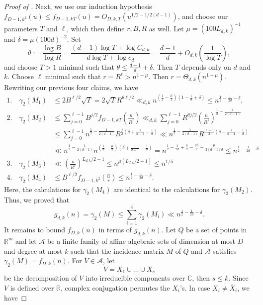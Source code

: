 \documentclass[10pt,a4paper]{amsart}
\begin{document}
\begin{proof}[Proof of ]
		Next, we use our induction hypothesis $f_{D-1,k^2}(u)\leq f_{D-1,kT}(u)= O_{D,k,T}(u^{1/2-1/2(d-1)})$, and choose our parameters $T$ and $\ell$, which then define $r,B,R$ as well. Let $\mu=(100L_{d,k})^{-1}$ and $\delta=\mu(100d)^{-2}$. Set
		$$\theta:=\frac{\log B}{\log R}=\frac{(d-1)\log T+\log C_{d,k}}{d\log T+\log c_{d}}=\frac{d-1}{d}+O_{d,k}\left(\frac{1}{\log T}\right),$$
		and choose $T>1$ minimal such that $\theta\leq \frac{d-1}{d}+\delta$. Then $T$ depends only on $d$ and $k$. Choose $\ell$ minimal such that $r=R^{\ell}>n^{1-\mu}$. Then $r=\Theta_{d,k}(n^{1-\mu})$. Rewriting our previous four claims, we have 
		\begin{align*}
			1.\quad \gamma_2(M_1)&\leq 2 B^{\ell/2}\sqrt{T}=2\sqrt{T} R^{\theta \ell/2}\ll_{d,k} n^{(\frac{1}{2}-\frac{\mu}{2})(1-\frac{1}{d}+\delta)}\leq n^{\frac{1}{2}-\frac{1}{2d}-\delta},\\
			2.\quad\gamma_2(M_2)&\leq \sum_{j=0}^{\ell-1}B^{j/2}f_{D-1,kT}\left(\frac{n}{R^j}\right)\ll_{d,k} \sum_{j=0}^{\ell-1} R^{\theta j/2} \left(\frac{n}{R^j}\right)^{\frac{1}{2}-\frac{1}{2(d-1)}}\\
			&\leq \sum_{j=0}^{\ell-1} n^{\frac{1}{2}-\frac{1}{2(d-1)}} R^{\frac{j}{2}(\delta+\frac{1}{d-1}-\frac{1}{d})}\ll n^{\frac{1}{2}-\frac{1}{2(d-1)}} R^{\frac{\ell-1}{2}(\delta+\frac{1}{d-1}-\frac{1}{d})}\\
			&\ll n^{\frac{1}{2}-\frac{1}{2(d-1)}} n^{(\frac{1}{2}-\frac{\mu}{2})(\delta+\frac{1}{d-1}-\frac{1}{d})}=n^{\frac{1}{2}-\frac{1}{2d}+\frac{\delta}{2}-\frac{\mu\delta}{2}-\frac{\mu}{2(d-1)d}}\leq n^{\frac{1}{2}-\frac{1}{2d}-\delta}\\
			3.\quad\gamma_2(M_3)&\ll \left(\frac{n}{R^{\ell}}\right)^{L_{d,k}/2-1}\leq n^{\mu (L_{d,k}/2-1)}\leq n^{1/5}\\
			4.\quad\gamma_2(M_4)&\leq B^{\ell/2}f_{D-1,k^2}\left(\frac{n}{r}\right)\leq n^{\frac{1}{2}-\frac{1}{2d}-\delta}.
		\end{align*}
		Here, the calculations for $\gamma_2(M_4)$ are identical to the calculations for $\gamma_2(M_2)$. Thus, we proved that
		$$g_{d,k}(n)=\gamma_2(M)\leq \sum_{i=1}^{4}\gamma_2(M_i)\ll  n^{\frac{1}{2}-\frac{1}{2d}-\delta}.$$
		It remains to bound $f_{D,k}(n)$ in terms of $g_{d,k}(n)$. Let $Q$ be a set of points in $\mathbb{R}^m$ and let $\mathcal{A}$ be a finite family of affine algebraic sets of dimension at most $D$ and degree at most $k$ such that the incidence matrix $M$ of $Q$ and  $\mathcal{A}$ satisfies $\gamma_2(M)=f_{D,k}(n)$. For $V\in \mathcal{A}$, let
		$$V=X_1\cup\dots\cup X_s$$
		be the decomposition of $V$ into irreducible components over $\mathbb{C}$, then $s\leq k$. Since $V$ is defined over $\mathbb{R}$, complex conjugation permutes the $X_i$'s. In case $X_i\neq \overline{X}_i$, we have

\end{proof}
\end{document}
